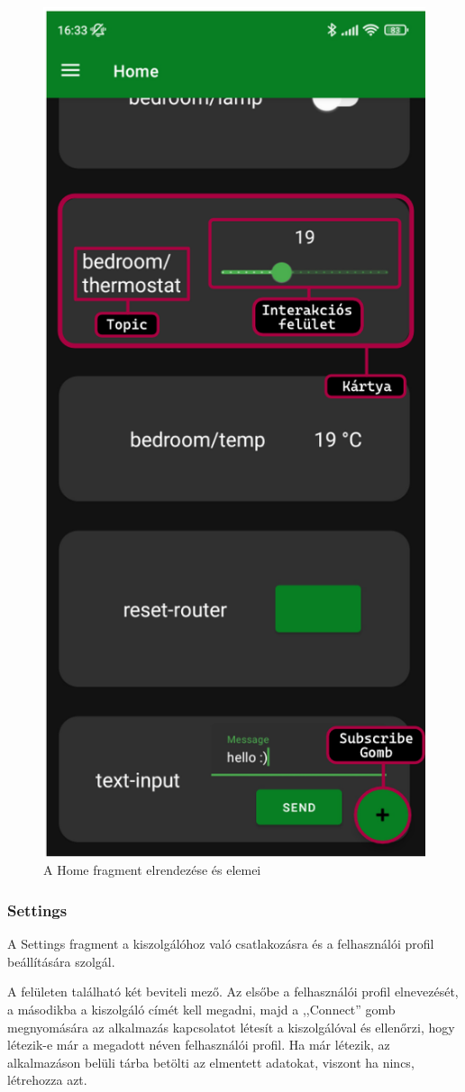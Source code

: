 \documentclass[
]{thesis-ekf}
\theoremstyle{definition}
\theoremstyle{remark}
\begin{document}
\begin{figure}[H]
	\centering
	\includegraphics[width=0.5\linewidth]{images/home_anatomy.png}
	\caption{A Home fragment elrendezése és elemei}
	\label{fig_home_anatomy}
\end{figure}
	
\subsubsection{Settings}
A Settings fragment a kiszolgálóhoz való csatlakozásra és a felhasználói profil beállítására szolgál.

A felületen található két beviteli mező. Az elsőbe a felhasználói profil elnevezését, a másodikba a kiszolgáló címét
kell megadni, majd a ,,Connect'' gomb megnyomására az alkalmazás  kapcsolatot létesít a kiszolgálóval és ellenőrzi, hogy
létezik-e már a megadott néven felhasználói profil. Ha már létezik, az alkalmazáson belüli tárba betölti az elmentett adatokat,
viszont ha nincs, létrehozza azt.
\end{document}
